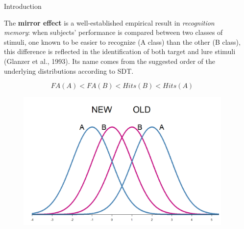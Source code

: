 \documentclass[final]{beamer}
\newlength{\sepwid}
\newlength{\onecolwid}
\begin{document}
\begin{frame}[t]

\begin{columns}[t] %
\begin{column}{\sepwid}\end{column} %
\begin{column}{\onecolwid} %
\vspace{-2.5cm}
\begin{alertblock}{Introduction}

The \textbf{mirror effect} is a well-established empirical result in \textit{recognition memory}: when  subjects' performance is compared between two classes of stimuli, one known to be easier to recognize (A class) than the other (B class), this difference is reflected in the identification of both target and lure stimuli (Glanzer et al., 1993). Its name comes from the suggested order of the underlying distributions according to SDT.

\begin{equation}
FA(A) < FA(B) < Hits(B) < Hits(A)
\end{equation}


\begin{figure}
\includegraphics[width=0.4\linewidth]{Figures/MirrorEffect.png}
\end{figure}

\end{alertblock}




\end{column}
\end{columns}
\end{frame}
\end{document}
